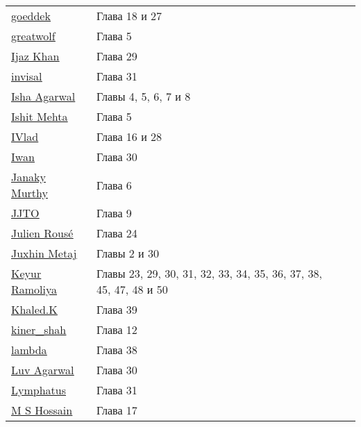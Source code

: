 \begin{tabular}{p{}ll}
\href{https://stackoverflow.com/users/4515432/}{\underline{goeddek}} & Глава 18 и 27 \\
\href{https://stackoverflow.com/users/234175/}{\underline{greatwolf}} & Глава 5 \\
\href{https://stackoverflow.com/users/4550110/}{\underline{Ijaz Khan}} & Глава 29 \\
\href{https://stackoverflow.com/users/1332934/}{\underline{invisal}} & Глава 31 \\
\href{https://stackoverflow.com/users/5489591/}{\underline{Isha Agarwal}} & Главы 4, 5, 6, 7 и 8 \\
\href{https://stackoverflow.com/users/2516438/}{\underline{Ishit Mehta}} & Глава 5 \\
\href{https://stackoverflow.com/users/270287/}{\underline{IVlad}} & Глава 16 и 28 \\
\href{https://stackoverflow.com/users/4900669/}{\underline{Iwan}} & Глава 30 \\
\href{https://stackoverflow.com/users/5537078/}{\underline{Janaky Murthy}} & Глава 6 \\
\href{https://stackoverflow.com/users/6732642/}{\underline{JJTO}} & Глава 9 \\
\href{https://stackoverflow.com/users/3729797/}{\underline{Julien Rousé}} & Глава 24 \\
\href{https://stackoverflow.com/users/7190578/}{\underline{Juxhin Metaj}} & Главы 2 и 30 \\
\href{https://stackoverflow.com/users/6326344/}{\underline{Keyur Ramoliya}} & Главы 23, 29, 30, 31, 32, 33, 34, 35, 36, 37, 38, 45, 47, 48 и 50 \\
\href{https://stackoverflow.com/users/2128327/}{\underline{Khaled.K}} & Глава 39 \\
\href{https://stackoverflow.com/users/4688321/}{\underline{kiner\_shah}} & Глава 12 \\
\href{https://stackoverflow.com/users/7565799/}{\underline{lambda}} & Глава 38 \\
\href{https://stackoverflow.com/users/5016614/}{\underline{Luv Agarwal}} & Глава 30 \\
\href{https://stackoverflow.com/users/5222625/}{\underline{Lymphatus}} & Глава 31 \\
\href{https://stackoverflow.com/users/5882770/}{\underline{M S Hossain}} & Глава 17 \\
\end{tabular}

